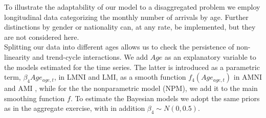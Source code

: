 \documentclass{article}\usepackage[]{graphicx}\usepackage[]{color}
\begin{document}
To illustrate the adaptability of our model to a disaggregated problem we employ longitudinal data categorizing the monthly number of arrivals by age. Further distinctions by gender or nationality can, at any rate, be implemented, but they are not considered here. \\
Splitting our data into different ages allows us to check the persistence of non-linearity and trend-cycle interactions. We add  $Age$ as an explanatory variable to the models estimated for the time series. The latter is introduced as a parametric term, $\beta_4 Age_{age,t}$, in LMNI and LMI, as a smooth function $ f_{4}(Age_{age,t})$ in AMNI and AMI , while for the the nonparametric model (NPM), we add it to the main smoothing function $f$. To estimate the Bayesian models we adopt the same priors as in the aggregate exercise, with in addition $\beta_4 \sim N(0,0.5)$. 

\end{document}
